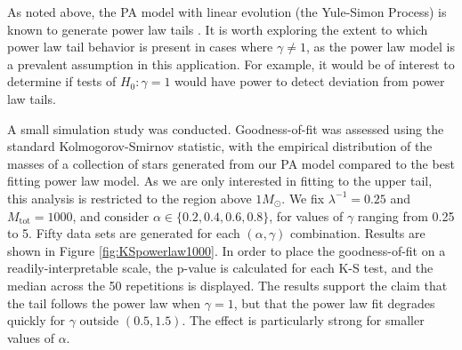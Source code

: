 \documentclass[ejs]{imsart}
\numberwithin{equation}{section}
\theoremstyle{plain}
\newcommand{\jessi}[1]{{\color{blue}[[\textbf{Jessi: }#1]]}}
\newcommand{\Msun}{M_{\odot}}
\newcommand{\Mtot}{M_{\text{tot}}}
\begin{document}
As noted above, the PA model with linear evolution (the Yule-Simon Process) is 
known to generate power law tails \citep{newman2005}.
It is worth exploring the extent to which power law tail behavior is present 
in cases where $\gamma \neq 1$, as the power law model is a prevalent
assumption in this application. For example, it would be of interest to determine
if tests of $H_0\!:\gamma = 1$ would have power to detect deviation from
power law tails.

A small simulation study was conducted. Goodness-of-fit was assessed using the
standard Kolmogorov-Smirnov statistic, with the empirical distribution
of the masses of a collection of stars generated 
from our PA model compared to the best fitting power law model.
As we are only interested in fitting to the upper tail, this analysis 
is restricted to the region above $1 \Msun$. We fix $\lambda^{-1} = 0.25$
and $\Mtot = 1000$, and consider $\alpha \in \{0.2,0.4,0.6,0.8\}$, for
values of $\gamma$ ranging from 0.25 to 5. Fifty data sets are generated
for each $(\alpha, \gamma)$ combination. Results are shown in Figure \ref{fig:KSpowerlaw1000}.
In order to place the goodness-of-fit on a readily-interpretable scale, the p-value
is calculated for each K-S test, and the median across the 50 repetitions is displayed.
The results support the claim that the tail follows the power law when $\gamma = 1$, but that
the power law fit degrades quickly for $\gamma$ outside $(0.5, 1.5)$. The effect is particularly
strong for smaller values of $\alpha$.

\end{document}
